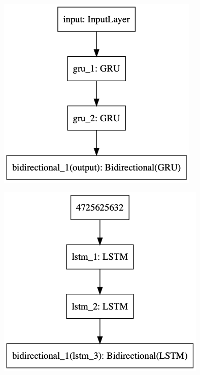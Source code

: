 \begin{figure}[h]
\centering
\begin{minipage}{.5\textwidth}
  \centering
  \includegraphics[width=1\linewidth]{./img/gru_architecture.png}
  \label{fig:gru_architecture}
\end{minipage}%
\begin{minipage}{.5\textwidth}
  \centering
  \includegraphics[width=1\linewidth]{./img/lstm_architecture.png}
  \label{fig:lstm_architecture}
\end{minipage}
\end{figure}\label{fig:nn_architectures}


